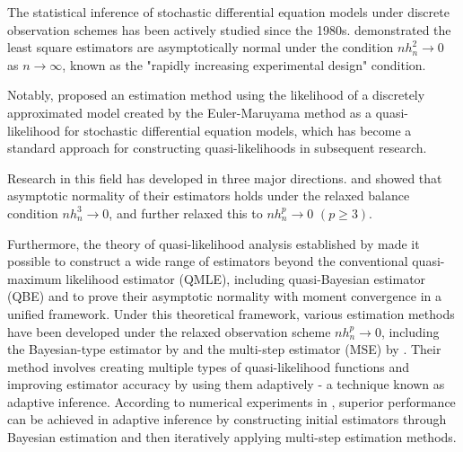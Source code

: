 \documentclass[a4paper,11pt]{jsarticle}
\begin{document}
The statistical inference of stochastic differential equation models under discrete observation schemes has been actively studied since the 1980s. \cite{PrakasaRao1983,PrakasaRao1988} demonstrated the least square estimators are asymptotically normal under the condition $nh_n^2 \to 0$ as $n \to \infty$, known as the "rapidly increasing experimental design" condition.

Notably, \cite{Florens-Zmirou1989} proposed an estimation method using the likelihood of a discretely approximated model created by the Euler-Maruyama method as a quasi-likelihood for stochastic differential equation models, which has become a standard approach for constructing quasi-likelihoods in subsequent research.

Research in this field has developed in three major directions. \cite{Florens-Zmirou1989} and \cite{Yoshida1992} showed that asymptotic normality of their estimators holds under the relaxed balance condition $nh_n^3 \to 0$, and \cite{Kessler1997} further relaxed this to $nh_n^p \to 0$ $(p\geq 3)$.

Furthermore, the theory of quasi-likelihood analysis established by \cite{yoshida2011polynomial} made it possible to construct a wide range of estimators beyond the conventional quasi-maximum likelihood estimator (QMLE), including quasi-Bayesian estimator (QBE) and to prove their asymptotic normality with moment convergence in a unified framework. Under this theoretical framework, various estimation methods have been developed under the relaxed observation scheme $nh_n^p \to 0$, including the Bayesian-type estimator by \cite{UchidaYoshida2012Adaptive} and the multi-step estimator (MSE) by \cite{KamataniUchida2014}. Their method involves creating multiple types of quasi-likelihood functions and improving estimator accuracy by using them adaptively - a technique known as adaptive inference. According to numerical experiments in \cite{KamataniUchida2014}, superior performance can be achieved in adaptive inference by constructing initial estimators through Bayesian estimation and then iteratively applying multi-step estimation methods.
\end{document}
